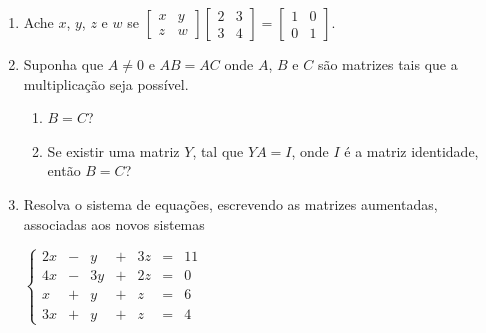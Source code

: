 \documentclass{article}
\begin{document}
\begin{enumerate}
\begin{enumerate}[label=\alph*.]
	\item ${(-A)}^T = -{(A)}^T$
	\item ${(A + B)}^T = B^T + A^T$
	\item Se $AB = 0$, ent\~ao $A = 0$ ou $B = 0$.
	\item ${(k_1A)}{(k_2B)} = {(k_1k_2)}AB$
	\item ${(-A)}{(-B)} = -{(AB)}$
	\item Se $A$ e $B$ s\~ao matrizes sim\'etricas, ent\~ao $AB = BA$.
	\item Se $AB = 0$, ent\~ao $BA = 0$.
	\item Se podemos efetuar o produto $AA$, ent\~ao $A$ \'e uma matriz quadrada.
\end{enumerate}

\item Ache $x$, $y$, $z$ e $w$ se
$\left[\begin{array}{cc}
	x & y \\
	z & w
\end{array}\right]
\left[\begin{array}{cc}
	2 & 3 \\
	3 & 4
\end{array}\right] = 
\left[\begin{array}{cc}
	1 & 0 \\
	0 & 1
\end{array}\right]$.

\item Suponha que $A \neq{} 0$ e $AB = AC$ onde $A$, $B$ e $C$ s\~ao
matrizes tais que a multiplica\c{c}\~ao seja poss\'ivel.

\begin{enumerate}[label=\alph*.]
	\item $B = C$?
	\item Se existir uma matriz $Y$, tal que $YA = I$, onde $I$ \'e a matriz
		identidade, ent\~ao $B = C$?
\end{enumerate}

\item Resolva o sistema de equa\c{c}\~oes, escrevendo as matrizes aumentadas,
	associadas aos novos sistemas

$\left\{
\begin{array}{ccccccc}
	2x & - & y & + & 3z & = & 11 \\
	4x & - & 3y & + & 2z & = & 0 \\
	x & + & y & + & z & = & 6 \\
	3x & + & y & + & z & = & 4
\end{array}
\right.$


\end{enumerate}
\end{document}
